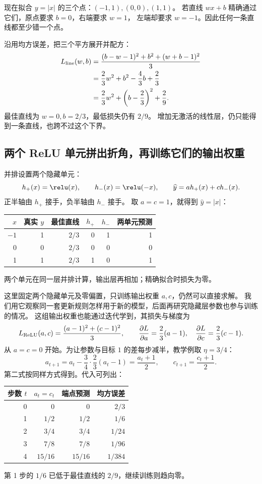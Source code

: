 现在拟合 $y=|x|$ 的三个点：$(-1,1),(0,0),(1,1)$。
若直线 $wx+b$ 精确通过它们，原点要求 $b=0$，右端要求 $w=1$，
左端却要求 $w=-1$。因此任何一条直线都至少错一个点。

沿用均方误差，把三个平方展开并配方：
\[
\begin{aligned}
L_{\rm line}(w,b)&=\frac{(b-w-1)^2+b^2+(w+b-1)^2}{3}\\
&=\frac23w^2+b^2-\frac43b+\frac23\\
&=\frac23w^2+\left(b-\frac23\right)^2+\frac29.
\end{aligned}
\]
最佳直线为 $w=0,b=2/3$，最低损失仍有 $2/9$。
增加无激活的线性层，仍只能得到一条直线，也跨不过这个下界。

\subsection{两个 ReLU 单元拼出折角，再训练它们的输出权重}

并排设置两个隐藏单元：
\[
h_+(x)=\relu(x),\qquad h_-(x)=\relu(-x),\qquad
\widehat{y}=a h_+(x)+c h_-(x).
\]
正半轴由 $h_+$ 接手，负半轴由 $h_-$ 接手。
取 $a=c=1$，就得到 $\widehat{y}=|x|$：
\begin{center}\small
{}
\begin{tabular}{rrrrrr}
\toprule
$x$ & 真实 $y$ & 最佳直线 & $h_+$ & $h_-$ & 两单元预测\\\midrule
$-1$ & 1 & $2/3$ & 0 & 1 & 1\\
0 & 0 & $2/3$ & 0 & 0 & 0\\
1 & 1 & $2/3$ & 1 & 0 & 1\\
\bottomrule\end{tabular}
\end{center}
两个单元在同一层并排计算，输出层再相加；精确拟合时损失为零。


这里固定两个隐藏单元及零偏置，只训练输出权重 $a,c$，仍然可以直接求解。
我们用它观察同一套更新规则怎样用于新的模型，后面再研究隐藏层参数也参与训练的情况。
这组输出权重也能通过迭代学到，其损失与梯度为
\[
L_{\rm ReLU}(a,c)=\frac{(a-1)^2+(c-1)^2}{3},\qquad
\frac{\partial L}{\partial a}=\frac23(a-1),\quad
\frac{\partial L}{\partial c}=\frac23(c-1).
\]
从 $a=c=0$ 开始。为让参数与目标 $1$ 的差每步减半，教学例取 $\eta=3/4$：
\[
a_{t+1}=a_t-\frac34\cdot\frac23(a_t-1)=\frac{a_t+1}{2},\qquad
c_{t+1}=\frac{c_t+1}{2}.
\]
第二式按同样方式得到。代入可列出：
\begin{center}\small
{}
\begin{tabular}{rrrr}
\toprule
步数 $t$ & $a_t=c_t$ & 端点预测 & 均方误差\\\midrule
0 & 0 & 0 & $2/3$\\
1 & $1/2$ & $1/2$ & $1/6$\\
2 & $3/4$ & $3/4$ & $1/24$\\
3 & $7/8$ & $7/8$ & $1/96$\\
4 & $15/16$ & $15/16$ & $1/384$\\
\bottomrule\end{tabular}
\end{center}
第 1 步的 $1/6$ 已低于最佳直线的 $2/9$，继续训练则趋向零。

